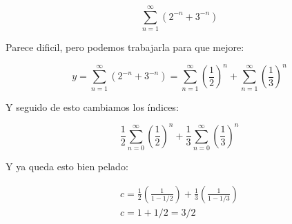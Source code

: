 \documentclass{article}
\newenvironment{cut-me-box}{
	\begin{tcolorbox}[
		colframe=white, %
		colback=white, %
		arc=1mm, %
		left=2mm, %
		right=2mm, %
		top=2mm, %
		bottom=2mm, %
		borderline={0.5mm}{0mm}{black!70!white,dashed},
		enhanced,
		boxrule=0.5mm,
		overlay={
			\node[anchor=north, yshift=-1mm, fill=white] at (frame.north east) {\large \emoji{scissors}}; %
		}
		]
	}{
	\end{tcolorbox}
}
\begin{document}
\begin{multicols}{2}
\begin{cut-me-box}
			\[
			\sum_{n=1}^{\infty} ( 2^{-n} + 3^{-n} )
			\]
			
			Parece dificil, pero podemos trabajarla para que mejore:
			
			\[
			y = \sum_{n=1}^{\infty} ( 2^{-n} + 3^{-n} ) = \sum_{n=1}^{\infty} (\frac{1}{2})^n + \sum_{n=1}^{\infty} (\frac{1}{3})^n
			\]
			
			Y seguido de esto cambiamos los índices:
			
			\[
			\frac{1}{2} \sum_{n=0}^{\infty} (\frac{1}{2})^n + \frac{1}{3} \sum_{n=0}^{\infty} (\frac{1}{3})^n
			\]
			
			Y ya queda esto bien pelado:
			
			\[
			\begin{array}{c}
				c = \frac{1}{2}( \frac{1}{1-1/2} ) + \frac{1}{3}( \frac{1}{1 - 1/3} ) \\
				c = 1 + 1/2 = 3/2
			\end{array}
			\]
			
		\end{cut-me-box}
	\end{multicols}
	
\end{document}
